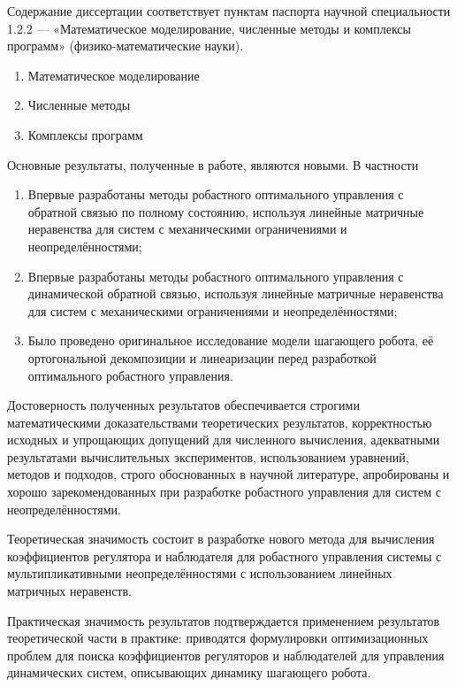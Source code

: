 {\compliances} 

Содержание диссертации соответствует пунктам паспорта научной специальности 1.2.2 — «Математическое моделирование, численные методы и комплексы программ» (физико-математические науки).
\begin{enumerate}[beginpenalty=10000]
	\item Математическое моделирование
	\item Численные методы
	\item Комплексы программ
\end{enumerate}

{\novelty}

Основные результаты, полученные в работе, являются новыми. В частности
\begin{enumerate}[beginpenalty=10000] %
	\item Впервые разработаны методы робастного оптимального управления с обратной связью по полному состоянию, используя линейные матричные неравенства для систем с механическими ограничениями и неопределённостями;
	\item Впервые разработаны методы робастного оптимального управления с динамической обратной связью, используя линейные матричные неравенства для систем с механическими ограничениями и неопределённостями;
	\item Было проведено оригинальное исследование модели шагающего робота, её ортогональной декомпозиции и линеаризации перед разработкой оптимального робастного управления.
\end{enumerate}

{\probation}

Достоверность полученных результатов обеспечивается строгими математическими доказательствами теоретических результатов, корректностью исходных и упрощающих допущений для численного вычисления, адекватными результатами вычислительных экспериментов, использованием уравнений, методов и подходов, строго обоснованных в научной литературе, апробированы и хорошо зарекомендованных при разработке робастного управления для систем с неопределённостями. 

{\influence} 

Теоретическая значимость состоит в разработке нового метода для вычисления коэффициентов регулятора и наблюдателя для робастного управления системы с мультипликативными неопределённостями с использованием линейных матричных неравенств.

Практическая значимость результатов подтверждается применением результатов теоретической части в практике: приводятся формулировки оптимизационных проблем для поиска коэффициентов регуляторов и наблюдателей для управления динамических систем, описывающих динамику шагающего робота. 


